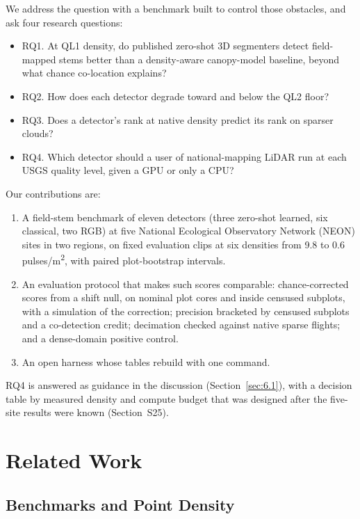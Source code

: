\documentclass[journal]{IEEEtran}
\providecommand{\tightlist}{\setlength{\itemsep}{0pt}\setlength{\parskip}{0pt}}
\begin{document}
We address the question with a benchmark built to control those obstacles, and
ask four research questions:

\begin{itemize}
\tightlist
\item
  RQ1. At QL1 density, do published zero-shot 3D segmenters detect field-mapped
  stems better than a density-aware canopy-model baseline, beyond what chance
  co-location explains?
\item
  RQ2. How does each detector degrade toward and below the QL2 floor?
\item
  RQ3. Does a detector's rank at native density predict its rank on sparser
  clouds?
\item
  RQ4. Which detector should a user of national-mapping LiDAR run at each USGS
  quality level, given a GPU or only a CPU?
\end{itemize}

Our contributions are:

\begin{enumerate}
\tightlist
\item
  A field-stem benchmark of eleven detectors (three zero-shot learned, six
  classical, two RGB) at five National Ecological Observatory Network (NEON)
  sites in two regions, on fixed evaluation clips at six densities from 9.8 to
  0.6 pulses/m\textsuperscript{2}, with paired plot-bootstrap intervals.
\item
  An evaluation protocol that makes such scores comparable: chance-corrected
  scores from a shift null, on nominal plot cores and inside censused subplots,
  with a simulation of the correction; precision bracketed by censused subplots
  and a co-detection credit; decimation checked against native sparse flights;
  and a dense-domain positive control.
\item
  An open harness whose tables rebuild with one command.
\end{enumerate}

RQ4 is answered as guidance in the discussion (Section~\ref{sec:6.1}), with a decision
table by measured density and compute budget that was designed after the
five-site results were known (Section~S25).

\section{Related Work}\label{sec:2}

\subsection{Benchmarks and Point Density}\label{sec:2.1}
\end{document}
